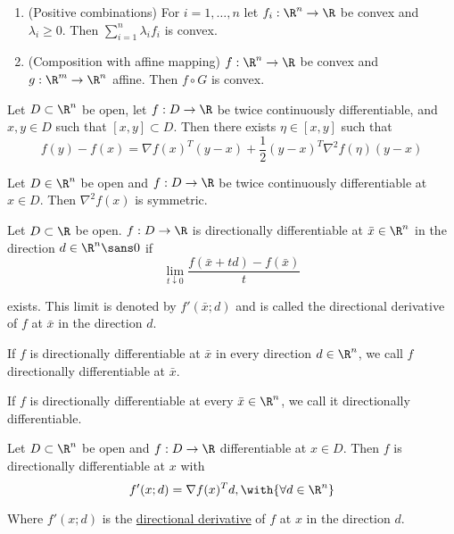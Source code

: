 \label{ddce2a7}

\begin{enumerate}
  \item (Positive combinations) For $i=1,\ldots,n$ let $f_i:\R^n\to\R$ be
        convex and $\lambda_i\geq0$. Then $\sum_{i=1}^n\lambda_if_i$ is
        convex.
  \item (Composition with affine mapping) $f:\R^n\to\R$ be convex
        and $g:\R^m\to\R^n$ affine. Then $f\circ G$ is convex.
\end{enumerate}

\label{b90111f}

Let $D\subset\R^n$ be open, let $f:D\to\R$ be twice continuously
differentiable, and $x,y\in D$ such that $[x,y]\subset D$. Then there exists
$\eta\in[x,y]$ such that
$$
  f(y)-f(x)=\nabla f(x)^T(y-x)+\frac12(y-x)^T\nabla^2f(\eta)(y-x)
$$

\label{c3524e9}

Let $D\in\R^n$ be open and $f:D\to\R$ be twice continuously differentiable at
$x\in D$. Then $\nabla^2f(x)$ is symmetric.

\label{b7d1188}

Let $D\subset \R$ be open. $f:D\to\R$ is directionally differentiable at $\bar
x\in\R^n$ in the direction $d\in\R^n\sans0$ if
$$
  \lim_{t\downarrow0}\frac{f(\bar x+td)-f(\bar x)}t
$$

exists. This limit is denoted by $f'(\bar x;d)$ and is called the directional
derivative of $f$ at $\bar x$ in the direction $d$.

If $f$ is directionally differentiable at $\bar x$ in every direction
$d\in\R^n$, we call $f$ directionally differentiable at $\bar x$.

If $f$ is directionally differentiable at every $\bar x\in\R^n$, we call it
directionally differentiable.

\label{ed67d29}

Let $D\subset \R^n$ be open and $f:D\to\R$ differentiable at $x\in D$. Then $f$
is directionally differentiable at $x$ with
$$
  f'(x;d)=\nabla f(x)^Td,\with{\forall d\in\R^n}
$$

Where $f'(x;d)$ is the \href{b7d1188}{directional derivative} of $f$ at $x$ in
the direction $d$.

